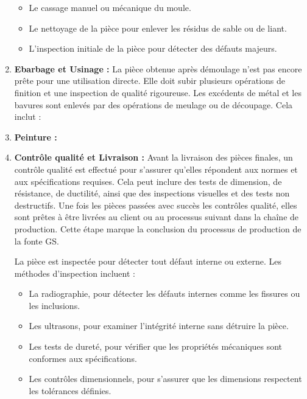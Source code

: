 \documentclass[12pt]{article}
\begin{document}
\begin{enumerate}
\begin{itemize}
    \item Le cassage manuel ou mécanique du moule.
    \item Le nettoyage de la pièce pour enlever les résidus de sable ou de liant.
    \item L'inspection initiale de la pièce pour détecter des défauts majeurs.
\end{itemize}

    \item \textbf{Ebarbage et Usinage :} 
    La pièce obtenue après démoulage n'est pas encore prête pour une utilisation directe. Elle doit subir plusieurs opérations de finition et une inspection de qualité rigoureuse.
    Les excédents de métal et les bavures sont enlevés par des opérations de meulage ou de découpage. Cela inclut :

    
    \item \textbf{Peinture :} 

    \item \textbf{Contrôle qualité et Livraison :} Avant la livraison des pièces finales, un 
    contrôle qualité est effectué pour s'assurer qu'elles répondent aux normes et 
    aux spécifications requises. Cela peut inclure des tests de dimension, de 
    résistance, de ductilité, ainsi que des inspections visuelles et des tests non 
    destructifs. Une fois les pièces passées avec succès les contrôles 
    qualité, elles sont prêtes à être livrées au client ou au processus suivant dans 
    la chaîne de production. Cette étape marque la conclusion du processus de 
    production de la fonte GS.

    La pièce est inspectée pour détecter tout défaut interne ou externe. Les méthodes d'inspection incluent :

\begin{itemize}
    \item La radiographie, pour détecter les défauts internes comme les fissures ou les inclusions.
    \item Les ultrasons, pour examiner l'intégrité interne sans détruire la pièce.
    \item Les tests de dureté, pour vérifier que les propriétés mécaniques sont conformes aux spécifications.
    \item Les contrôles dimensionnels, pour s'assurer que les dimensions respectent les tolérances définies.
\end{itemize}
\end{enumerate}
\end{document}
